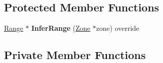 \subsection*{Protected Member Functions}
\begin{DoxyCompactItemize}
\item 
\hyperlink{classv8_1_1internal_1_1_range}{Range} $\ast$ {\bfseries Infer\+Range} (\hyperlink{classv8_1_1internal_1_1_zone}{Zone} $\ast$zone) override\hypertarget{classv8_1_1internal_1_1_h_constant_a73c349db8e3d806a9a383efbc4834df6}{}\label{classv8_1_1internal_1_1_h_constant_a73c349db8e3d806a9a383efbc4834df6}

\end{DoxyCompactItemize}
\subsection*{Private Member Functions}
